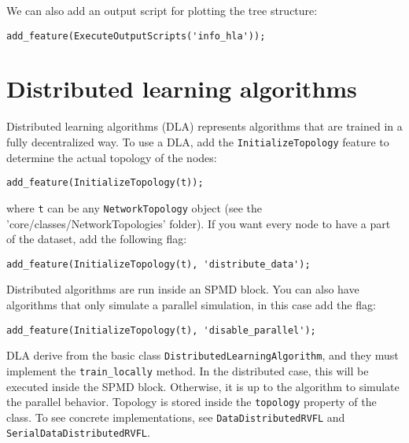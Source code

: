 \noindent We can also add an output script for plotting the tree structure:

\begin{lstlisting}
add_feature(ExecuteOutputScripts('info_hla'));
\end{lstlisting}

\section{Distributed learning algorithms}

Distributed learning algorithms (DLA) represents algorithms that are trained in a fully decentralized way. To use a DLA, add the \verb|InitializeTopology| feature to determine the actual topology of the nodes:

\begin{lstlisting}
add_feature(InitializeTopology(t));
\end{lstlisting}

\noindent where \verb|t| can be any \verb|NetworkTopology| object (see the 'core/classes/NetworkTopologies' folder). If you want every node to have a part of the dataset, add the following flag:

\begin{lstlisting}
add_feature(InitializeTopology(t), 'distribute_data');
\end{lstlisting}

\noindent Distributed algorithms are run inside an SPMD block. You can also have algorithms that only simulate a parallel simulation, in this case add the flag:

\begin{lstlisting}
add_feature(InitializeTopology(t), 'disable_parallel');
\end{lstlisting}

\noindent DLA derive from the basic class \verb|DistributedLearningAlgorithm|, and they must implement the \verb|train_locally| method. In the distributed case, this will be executed inside the SPMD block. Otherwise, it is up to the algorithm to simulate the parallel behavior. Topology is stored inside the \verb|topology| property of the class. To see concrete implementations, see \verb|DataDistributedRVFL| and \verb|SerialDataDistributedRVFL|.